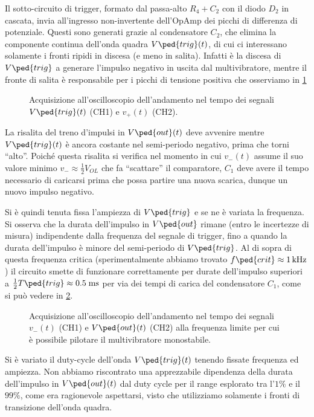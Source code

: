 \documentclass[10pt, a4paper, italian]{article}
\begin{document}
Il sotto-circuito di trigger, formato dal passa-alto $R_4 + C_2$ con il diodo
$D_2$ in cascata, invia all'ingresso non-invertente dell'OpAmp dei picchi di
differenza di potenziale. Questi sono generati grazie al condensatore $C_2$, 
che elimina la componente continua dell'onda quadra $V\ped{trig} (t)$, di cui
ci interessano solamente i fronti ripidi in discesa (e meno in salita).
Infatti è la discesa di $V\ped{trig}$ a generare l'impulso negativo in uscita
dal multivibratore, mentre il fronte di salita è responsabile per i picchi di
tensione positiva che osserviamo in \cref{fig: mstabilev+vtrig}
\begin{figure}[htbp]
	\centering
	\caption{Acquisizione all'oscilloscopio dell'andamento nel tempo dei
	segnali $V\ped{trig} (t)$ (CH1) e $v_+ (t)$ (CH2).
	\label{fig: mstabilev+vtrig}}
\end{figure}

La risalita del treno d'impulsi in $V\ped{out} (t)$ deve avvenire mentre
$V\ped{trig} (t)$ è ancora costante nel semi-periodo negativo, prima che torni
``alto''. Poiché questa risalita si verifica nel momento in cui $v_- (t)$
assume il suo valore minimo $v_- \approx \frac{1}{2} V_{OL}$ che fa
``scattare'' il comparatore, $C_1$ deve avere il tempo necessario di caricarsi
prima che possa partire una nuova scarica, dunque un nuovo impulso negativo.

Si è quindi tenuta fissa l'ampiezza di $V\ped{trig}$ e se ne è variata la
frequenza. Si osserva che la durata dell'impulso in $V\ped{out}$ rimane
(entro le incertezze di misura) indipendente dalla frequenza del segnale di
trigger, fino a quando la durata dell'impulso è minore del semi-periodo di
$V\ped{trig}$. Al di sopra di questa frequenza critica (sperimentalmente
abbiamo trovato $f\ped{crit} \approx \SI{1}{k\hertz}$) il circuito smette di
funzionare correttamente per durate dell'impulso superiori a
$\frac{1}{2} T\ped{trig} \approx 0.5 \; \si{m\s}$ per via dei tempi di carica
del condensatore $C_1$, come si può vedere in \cref{fig: mstabileflim}.
\begin{figure}[htbp]
	\centering
	\caption{Acquisizione all'oscilloscopio dell'andamento nel tempo dei
	segnali $v_- (t)$ (CH1) e $V\ped{out} (t)$ (CH2) alla frequenza limite
	per cui è possibile pilotare il multivibratore monostabile.
	\label{fig: mstabileflim}}
\end{figure}

Si è variato il duty-cycle dell'onda $V\ped{trig} (t)$ tenendo fissate
frequenza ed ampiezza. Non abbiamo riscontrato una apprezzabile dipendenza
della durata dell'impulso in $V\ped{out} (t)$ dal duty cycle per il range
esplorato tra l'$1 \%$ e il $99 \%$, come era ragionevole aspettarsi, visto che
utilizziamo solamente i fronti di transizione dell'onda quadra.
\end{document}
